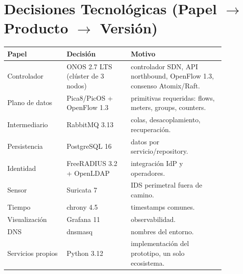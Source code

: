 \documentclass[11pt,a4paper]{report}
\begin{document}
\section{Decisiones Tecnológicas (Papel $\rightarrow$ Producto $\rightarrow$ Versión)}
\begin{longtable}{p{0.24\linewidth}p{0.26\linewidth}p{0.38\linewidth}}
\toprule
Papel & Decisión & Motivo \\
\midrule
Controlador & ONOS 2.7 LTS (clúster de 3 nodos) & controlador SDN, API northbound, OpenFlow 1.3, consenso Atomix/Raft. \\
Plano de datos & Pica8/PicOS + OpenFlow 1.3 & primitivas requeridas: flows, meters, groups, counters. \\
Intermediario & RabbitMQ 3.13 & colas, desacoplamiento, recuperación. \\
Persistencia & PostgreSQL 16 & datos por servicio/repository. \\
Identidad & FreeRADIUS 3.2 + OpenLDAP & integración IdP y operadores. \\
Sensor & Suricata 7 & IDS perimetral fuera de camino. \\
Tiempo & chrony 4.5 & timestamps comunes. \\
Visualización & Grafana 11 & observabilidad. \\
DNS & dnsmasq & nombres del entorno. \\
Servicios propios & Python 3.12 & implementación del prototipo, un solo ecosistema. \\
\bottomrule
\end{longtable}
\end{document}
